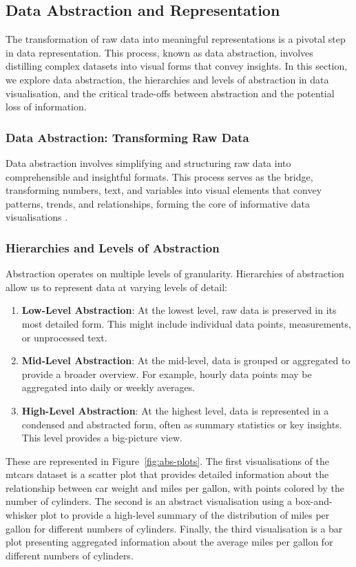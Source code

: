 \documentclass{article}\usepackage[]{graphicx}\usepackage[]{xcolor}
\begin{document}
\subsection{Data Abstraction and Representation}
The transformation of raw data into meaningful representations is a pivotal step in data representation. This process, known as data abstraction, involves distilling complex datasets into visual forms that convey insights. In this section, we explore data abstraction, the hierarchies and levels of abstraction in data visualisation, and the critical trade-offs between abstraction and the potential loss of information.

\subsubsection{Data Abstraction: Transforming Raw Data}
Data abstraction involves simplifying and structuring raw data into comprehensible and insightful formats. This process serves as the bridge, transforming numbers, text, and variables into visual elements that convey patterns, trends, and relationships, forming the core of informative data visualisations \cite{tufte2001visual}.

\subsubsection{Hierarchies and Levels of Abstraction}
Abstraction operates on multiple levels of granularity. Hierarchies of abstraction allow us to represent data at varying levels of detail: 
\begin{enumerate}
    \item \textbf{Low-Level Abstraction}: At the lowest level, raw data is preserved in its most detailed form. This might include individual data points, measurements, or unprocessed text.
    \item \textbf{Mid-Level Abstraction}: At the mid-level, data is grouped or aggregated to provide a broader overview. For example, hourly data points may be aggregated into daily or weekly averages.
    \item \textbf{High-Level Abstraction}: At the highest level, data is represented in a condensed and abstracted form, often as summary statistics or key insights. This level provides a big-picture view.
\end{enumerate}

\noindent 
These are represented in Figure~\ref{fig:abs-plots}. The first visualisations of the mtcars dataset is a scatter plot that provides detailed information about the relationship between car weight and miles per gallon, with points colored by the number of cylinders. The second is an abstract visualisation using a box-and-whisker plot to provide a high-level summary of the distribution of miles per gallon for different numbers of cylinders. Finally, the third visualisation is a bar plot presenting aggregated information about the average miles per gallon for different numbers of cylinders.
\end{document}
